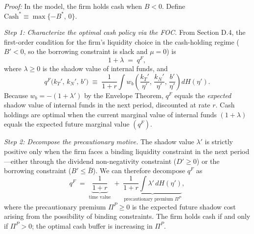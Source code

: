 \documentclass[12pt,a4paper]{article}
\begin{document}
\textit{Proof:}
In the model, the firm holds cash when $B<0$.
Define $\text{Cash}^{*}\equiv\max\{-B^{*},\,0\}$.

\medskip
\noindent\textit{Step 1: Characterize the optimal cash policy via the FOC.}\;
From Section D.4, the first-order condition for the firm's liquidity choice in the
cash-holding regime ($B'<0$, so the borrowing constraint is slack and $\mu=0$) is
%
\begin{equation}\tag{$\star$}
  1+\lambda \;=\; q^{F},
\end{equation}
%
where $\lambda\geq 0$ is the shadow value of internal funds, and
%
\begin{equation}\tag{49}
  q^{F}\!\bigl(k_{T}',\,k_{N}',\,b'\bigr)
  \;\equiv\;
  \frac{1}{1+r}\int w_{b}\!\!\left(
    \frac{k_{T}'}{\eta'},\,\frac{k_{N}'}{\eta'},\,\frac{b'}{\eta'}\right)
    dH(\eta').
\end{equation}
%
Because $w_{b}=-(1+\lambda')$ by the Envelope Theorem, $q^{F}$ equals the
\emph{expected} shadow value of internal funds in the next period, discounted at
rate $r$.  Cash holdings are optimal when the current marginal value of internal
funds $(1+\lambda)$ equals the expected future marginal value $(q^{F})$.

\medskip
\noindent\textit{Step 2: Decompose the precautionary motive.}\;
The shadow value $\lambda'$ is strictly positive only when the firm faces a
binding liquidity constraint in the next period---either through the dividend
non-negativity constraint ($D'\geq 0$) or the borrowing constraint
($B'\leq\bar{B}$).  We can therefore decompose $q^{F}$ as
%
\begin{equation}\tag{81a}
  q^{F}
  \;=\;
  \underbrace{\frac{1}{1+r}}_{\text{time value}}
  \;+\;
  \underbrace{\frac{1}{1+r}\int \lambda'\,dH(\eta')}_{\text{precautionary premium }\Pi^{P}},
\end{equation}
%
where the precautionary premium $\Pi^{P}\geq 0$ is the expected future shadow cost
arising from the possibility of binding constraints.  The firm holds cash if and
only if $\Pi^{P}>0$; the optimal cash buffer is increasing in $\Pi^{P}$.
\end{document}
